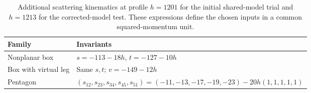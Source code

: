 \begin{table}[!htbp]\centering\small
\caption{Additional scattering kinematics at profile $h=1201$ for the initial shared-model trial and $h=1213$ for the corrected-model test. These expressions define the chosen inputs in a common squared-momentum unit.}
\label{tab:extra-kinematics}
\begin{tabularx}{\linewidth}{@{}lY@{}}\toprule
Family & Invariants\\\midrule
Nonplanar box & $s=-113-18h$, $t=-127-10h$\\
Box with virtual leg & Same $s,t$; $v=-149-12h$\\
Pentagon & $(s_{12},s_{23},s_{34},s_{45},s_{51})=(-11,-13,-17,-19,-23)-20h(1,1,1,1,1)$\\\bottomrule
\end{tabularx}
\end{table}
